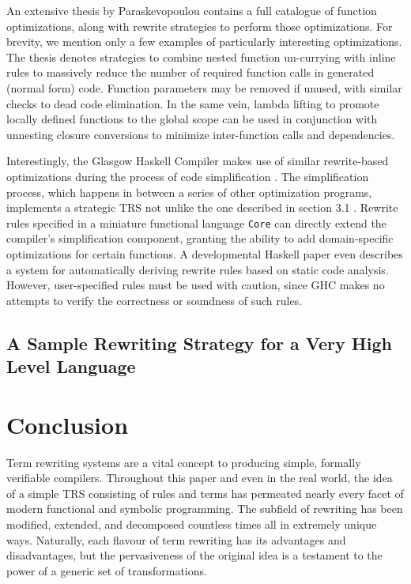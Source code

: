 \documentclass{article}
\begin{document}
An extensive thesis by Paraskevopoulou \cite{paraskevopoulou2020verified} contains a full catalogue of function optimizations,
along with rewrite strategies to perform those optimizations.
For brevity, we mention only a few examples of particularly interesting optimizations.
The thesis denotes strategies to combine nested function un-currying with inline rules
to massively reduce the number of required function calls in generated (normal form) code.
Function parameters may be removed if unused, with similar checks to dead code elimination.
In the same vein, lambda lifting to promote locally defined functions to the global scope can be used in conjunction with unnesting closure conversions
to minimize inter-function calls and dependencies.

Interestingly, the Glasgow Haskell Compiler makes use of similar rewrite-based optimizations during the process of code simplification \cite{brown2011architecture}.
The simplification process, which happens in between a series of other optimization programs, implements a strategic TRS not unlike the one described in section 3.1 .
Rewrite rules specified in a miniature functional language \texttt{Core} can directly extend the compiler's simplification component,
granting the ability to add domain-specific optimizations for certain functions.
A developmental Haskell paper \cite{peytonjones2001playing} even describes a system for automatically deriving rewrite rules based on static code analysis.
However, user-specified rules must be used with caution,
since GHC makes no attempts to verify the correctness or soundness of such rules.

\subsection{A Sample Rewriting Strategy for a Very High Level Language}
\section{Conclusion}

Term rewriting systems are a vital concept to producing simple, formally verifiable compilers.
Throughout this paper and even in the real world, the idea of a simple TRS consisting of rules and terms
has permeated nearly every facet of modern functional and symbolic programming. The subfield of rewriting has been modified, extended, and decomposed
countless times all in extremely unique ways. Naturally, each flavour of term rewriting has its advantages and disadvantages, but the pervasiveness of the original idea
is a testament to the power of a generic set of transformations.
\end{document}
